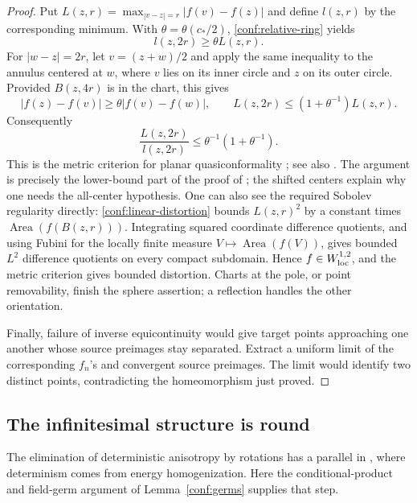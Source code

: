 \documentclass[11pt]{article}
\numberwithin{equation}{section}
\theoremstyle{definition}
\theoremstyle{remark}
\newcommand{\1}{\mathbf 1}
\DeclareMathOperator{\Area}{Area}
\begin{document}
\begin{proof}
Put \(L(z,r)=\max_{|v-z|=r}|f(v)-f(z)|\) and define
\(l(z,r)\) by the corresponding minimum.  With
\(\theta=\theta(c_*/2)\), \eqref{conf:relative-ring} yields
\[
 l(z,2r)\ge\theta L(z,r).
\]
For \(|w-z|=2r\), let \(v=(z+w)/2\) and apply the same
inequality to the annulus centered at \(w\), where \(v\) lies
on its inner circle and \(z\) on its outer circle.  Provided
\(B(z,4r)\) is in the chart, this gives
\[
 |f(z)-f(v)|\ge\theta|f(v)-f(w)|,
 \qquad
 L(z,2r)\le(1+\theta^{-1})L(z,r).
\]
Consequently
\begin{equation}
 \frac{L(z,2r)}{l(z,2r)}
       \le \theta^{-1}(1+\theta^{-1}).
 \label{conf:linear-distortion}
\end{equation}
This is the metric criterion for planar quasiconformality
\cite[Theorem~1]{Cristea1989Quasiconformality}; see also
\cite[Theorem~2.5.3]{AstalaIwaniecMartin2009}. The
argument is precisely the lower-bound part of the proof of
\cite[Lemma~3.1, equations~(3.3)--(3.7)]{IvriiMarkovic2019}; the
shifted centers explain why one needs the all-center hypothesis.
One can also see the required Sobolev regularity directly:
\eqref{conf:linear-distortion} bounds \(L(z,r)^2\) by a constant
times \(\Area(f(B(z,r)))\).  Integrating squared coordinate
difference quotients, and using Fubini for the locally finite
measure \(V\mapsto\Area(f(V))\), gives bounded \(L^2\)
difference quotients on every compact subdomain.  Hence
\(f\in W^{1,2}_{\rm loc}\), and the metric criterion gives
bounded distortion.  Charts at the pole, or point removability,
finish the sphere assertion; a reflection handles the other
orientation.

Finally, failure of inverse equicontinuity would give target points
approaching one another whose source preimages stay separated.
Extract a uniform limit of the corresponding \(f_n\)'s and
convergent source preimages.  The limit would identify two distinct
points, contradicting the homeomorphism just proved.
\end{proof}

\subsection{The infinitesimal structure is round}
\label{conf:tensor-subsection}

The elimination of deterministic anisotropy by rotations has a parallel
in \cite[Section~4.4]{HoldenYuUniformization}, where determinism comes
from energy homogenization.  Here the conditional-product and field-germ
argument of Lemma~\ref{conf:germs} supplies that step.
\end{document}
